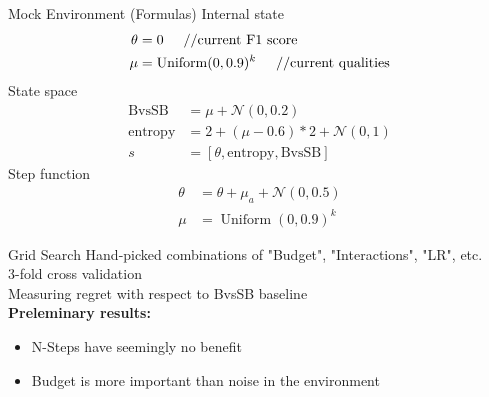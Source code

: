 \documentclass[aspectratio=169, 11pt, invertlogo]{ismll-slides}
\begin{document}


\begin{frame}[fragile]{Mock Environment (Formulas)}
	Internal state
	\begin{align*}
		\theta &= 0 \hspace{5mm}// \text{current F1 score} \\
		\mu &= \operatorname{Uniform}(0, 0.9)^k \hspace{5mm}// \text{current qualities}
	\end{align*}
	State space
	\begin{align*}
		\text{BvsSB} &= \mu + \mathcal{N}(0, 0.2) \\
		\text{entropy} &= 2 + (\mu - 0.6)*2 + \mathcal{N}(0, 1) \\
		s &= [\theta, \text{entropy}, \text{BvsSB}]
	\end{align*}
	Step function
	\begin{align*}
		\theta &= \theta + \mu_a + \mathcal{N}(0, 0.5) \\
		\mu &= \operatorname{Uniform}(0, 0.9)^k
	\end{align*}
\end{frame}




\begin{frame}[fragile]{Grid Search}
	Hand-picked combinations of "Budget", "Interactions", "LR", etc. \\ [1mm]
	3-fold cross validation \\ [1mm]
	Measuring regret with respect to BvsSB baseline \\ [1mm]
	\textbf{Preleminary results:}
	\begin{itemize}
		\item N-Steps have seemingly no benefit
		\item Budget is more important than noise in the environment
	\end{itemize}
\end{frame}


\appendix


%
%




\begin{frame}[allowframebreaks]%
%
%
\end{frame}

\end{document}
